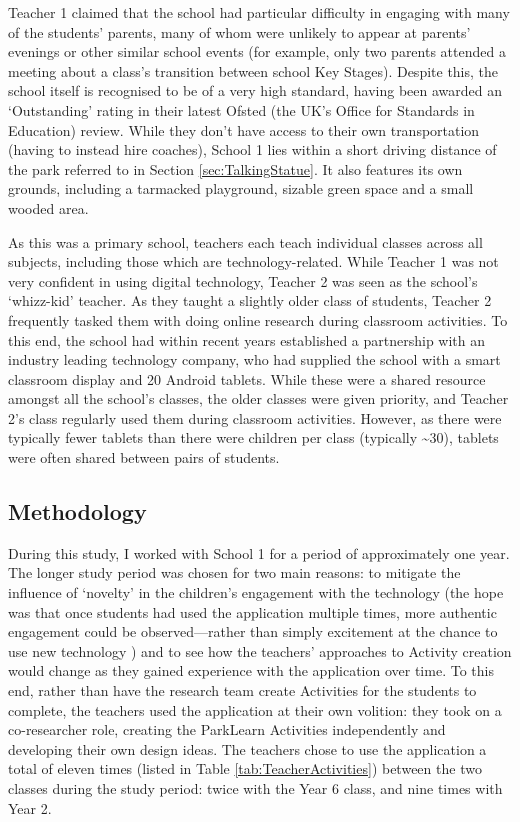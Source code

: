 Teacher 1 claimed that the school had particular difficulty in engaging with many of the students' parents, many of whom were unlikely to appear at parents' evenings or other similar school events (for example, only two parents attended a meeting about a class's transition between school Key Stages). Despite this, the school itself is recognised to be of a very high standard, having been awarded an `Outstanding' rating in their latest Ofsted (the UK’s Office for Standards in Education) review. While they don't have access to their own transportation (having to instead hire coaches), School 1 lies within a short driving distance of the park referred to in Section \ref{sec:TalkingStatue}. It also features its own grounds, including a tarmacked playground, sizable green space and a small wooded area.

As this was a primary school, teachers each teach individual classes across all subjects, including those which are technology-related. While Teacher 1 was not very confident in using digital technology, Teacher 2 was seen as the school's `whizz-kid' teacher. As they taught a slightly older class of students, Teacher 2 frequently tasked them with doing online research during classroom activities. To this end, the school had within recent years established a partnership with an industry leading technology company, who had supplied the school with a smart classroom display and 20 Android tablets. While these were a shared resource amongst all the school’s classes, the older classes were given priority, and Teacher 2's class regularly used them during classroom activities. However, as there were typically fewer tablets than there were children per class (typically \textasciitilde{}30), tablets were often shared between pairs of students.

\subsection{Methodology}

During this study, I worked with School 1 for a period of approximately one year. The longer study period was chosen for two main reasons: to mitigate the influence of `novelty' in the children’s engagement with the technology (the hope was that once students had used the application multiple times, more authentic engagement could be observed---rather than simply excitement at the chance to use new technology \citep{Sharples2013}) and to see how the teachers' approaches to Activity creation would change as they gained experience with the application over time. To this end, rather than have the research team create Activities for the students to complete, the teachers used the application at their own volition: they took on a co-researcher role, creating the ParkLearn Activities independently and developing their own design ideas. The teachers chose to use the application a total of eleven times (listed in Table \ref{tab:TeacherActivities}) between the two classes during the study period: twice with the Year 6 class, and nine times with Year 2.

